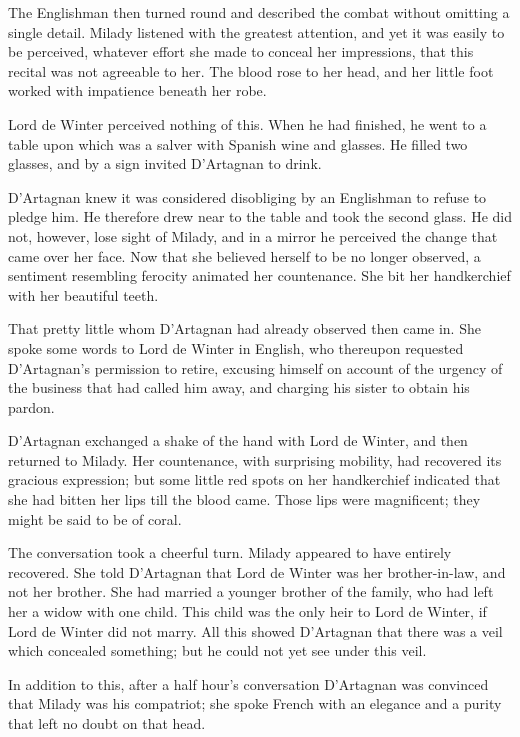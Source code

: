 The Englishman then turned round and described the combat without omitting a single detail. Milady listened with the greatest attention, and yet it was easily to be perceived, whatever effort she made to conceal her impressions, that this recital was not agreeable to her. The blood rose to her head, and her little foot worked with impatience beneath her robe. 

Lord de Winter perceived nothing of this. When he had finished, he went to a table upon which was a salver with Spanish wine and glasses. He filled two glasses, and by a sign invited D'Artagnan to drink. 

D'Artagnan knew it was considered disobliging by an Englishman to refuse to pledge him. He therefore drew near to the table and took the second glass. He did not, however, lose sight of Milady, and in a mirror he perceived the change that came over her face. Now that she believed herself to be no longer observed, a sentiment resembling ferocity animated her countenance. She bit her handkerchief with her beautiful teeth. 

That pretty little  whom D'Artagnan had already observed then came in. She spoke some words to Lord de Winter in English, who thereupon requested D'Artagnan's permission to retire, excusing himself on account of the urgency of the business that had called him away, and charging his sister to obtain his pardon. 

D'Artagnan exchanged a shake of the hand with Lord de Winter, and then returned to Milady. Her countenance, with surprising mobility, had recovered its gracious expression; but some little red spots on her handkerchief indicated that she had bitten her lips till the blood came. Those lips were magnificent; they might be said to be of coral. 

The conversation took a cheerful turn. Milady appeared to have entirely recovered. She told D'Artagnan that Lord de Winter was her brother-in-law, and not her brother. She had married a younger brother of the family, who had left her a widow with one child. This child was the only heir to Lord de Winter, if Lord de Winter did not marry. All this showed D'Artagnan that there was a veil which concealed something; but he could not yet see under this veil. 

In addition to this, after a half hour's conversation D'Artagnan was convinced that Milady was his compatriot; she spoke French with an elegance and a purity that left no doubt on that head. 

